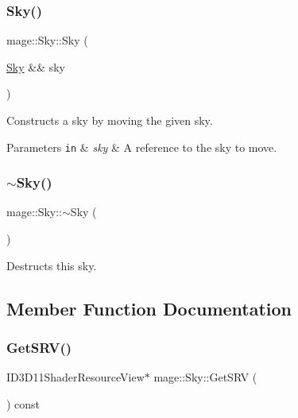 \subsubsection{\texorpdfstring{Sky()}{Sky()}\hspace{0.1cm}{\footnotesize\ttfamily [3/3]}}
{\footnotesize\ttfamily mage\+::\+Sky\+::\+Sky (\begin{DoxyParamCaption}\item[{\hyperlink{structmage_1_1_sky}{Sky} \&\&}]{sky }\end{DoxyParamCaption})\hspace{0.3cm}{\ttfamily [default]}}

Constructs a sky by moving the given sky.


\begin{DoxyParams}[1]{Parameters}
\mbox{\tt in}  & {\em sky} & A reference to the sky to move. \\
\hline
\end{DoxyParams}
\hypertarget{structmage_1_1_sky_a42c605bd010c1c6576c3ecf32cd0e962}{}\label{structmage_1_1_sky_a42c605bd010c1c6576c3ecf32cd0e962} 
\subsubsection{\texorpdfstring{$\sim$\+Sky()}{~Sky()}}
{\footnotesize\ttfamily mage\+::\+Sky\+::$\sim$\+Sky (\begin{DoxyParamCaption}{ }\end{DoxyParamCaption})\hspace{0.3cm}{\ttfamily [default]}}

Destructs this sky. 

\subsection{Member Function Documentation}
\hypertarget{structmage_1_1_sky_ae72817d4b5015b985234183b6474f5d6}{}\label{structmage_1_1_sky_ae72817d4b5015b985234183b6474f5d6} 
\subsubsection{\texorpdfstring{Get\+S\+R\+V()}{GetSRV()}}
{\footnotesize\ttfamily I\+D3\+D11\+Shader\+Resource\+View$\ast$ mage\+::\+Sky\+::\+Get\+S\+RV (\begin{DoxyParamCaption}{ }\end{DoxyParamCaption}) const\hspace{0.3cm}{\ttfamily [noexcept]}}

